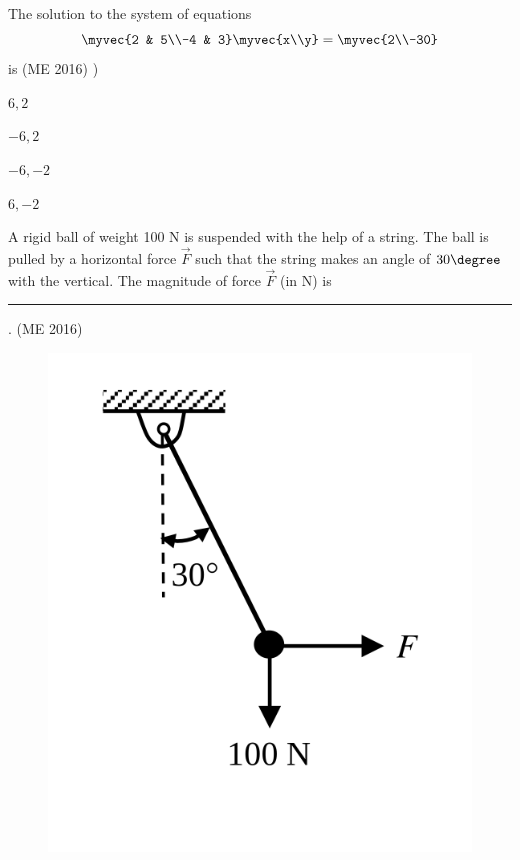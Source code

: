     \item The solution to the system of equations
          \[
              \myvec{2 & 5\\-4 & 3}\myvec{x\\y}=\myvec{2\\-30}
          \]
          is
	  \hfill(ME 2016)
	  )
          \begin{enumerate}
              \begin{multicols}{4}
                  \item $6, 2$
                  \item $-6, 2$
                  \item $-6, -2$
                  \item $6, -2$
              \end{multicols}
          \end{enumerate}
  \item A rigid ball of weight 100 N is suspended with the help of a string. The ball is pulled by a horizontal force $\vec{F}$ such that the string makes an angle of $30\degree$ with the vertical. The magnitude of force $\vec{F}$ (in N) is \rule{1cm}{0.01pt}.
	  \hfill(ME 2016)
          \begin{figure}[H]
              \centering
              \includegraphics[scale=0.3]{GATE/2016/ME/figs/q6.png}
              \caption{}
              \label{q6}
          \end{figure}
